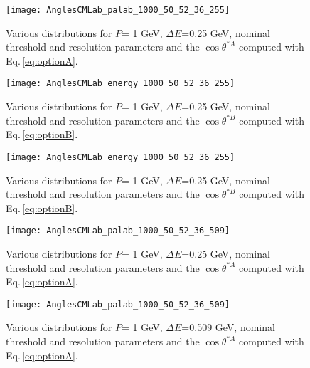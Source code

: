 \documentclass[12pt]{article}
\begin{document}
\begin{figure}[tbph]
\begin{center}
\texttt{[image: AnglesCMLab\_palab\_1000\_50\_52\_36\_255]}
\caption{Various distributions for $P$= 1 GeV, $\Delta E$=0.25 GeV, nominal threshold and resolution parameters and the $\cos{\theta^{*A}}$ computed with Eq.\,\ref{eq:optionA}.
\label{fig:AnglesCMLab_palab_1000_50_52_36_255_p3}}
\end{center}
\end{figure}

\begin{figure}[tbph]
\begin{center}
\texttt{[image: AnglesCMLab\_energy\_1000\_50\_52\_36\_255]}
\caption{Various distributions for $P$= 1 GeV, $\Delta E$=0.25 GeV, nominal threshold and resolution parameters and the $\cos{\theta^{*B}}$ computed with Eq.\,\ref{eq:optionB}.
\label{fig:AnglesCMLab_energy_1000_50_52_36_255_p2}}
\end{center}
\end{figure}

\begin{figure}[tbph]
\begin{center}
\texttt{[image: AnglesCMLab\_energy\_1000\_50\_52\_36\_255]}
\caption{Various distributions for $P$= 1 GeV, $\Delta E$=0.25 GeV, nominal threshold and resolution parameters and the $\cos{\theta^{*B}}$ computed with Eq.\,\ref{eq:optionB}.
\label{fig:AnglesCMLab_energy_1000_50_52_36_255_p3}}
\end{center}
\end{figure}

\begin{figure}[tbph]
\begin{center}
\texttt{[image: AnglesCMLab\_palab\_1000\_50\_52\_36\_509]}
\caption{Various distributions for $P$= 1 GeV, $\Delta E$=0.25 GeV, nominal threshold and resolution parameters and the $\cos{\theta^{*A}}$ computed with Eq.\,\ref{eq:optionA}.
\label{fig:AnglesCMLab_palab_1000_50_52_36_509_p2}}
\end{center}
\end{figure}

\begin{figure}[tbph]
\begin{center}
\texttt{[image: AnglesCMLab\_palab\_1000\_50\_52\_36\_509]}
\caption{Various distributions for $P$= 1 GeV, $\Delta E$=0.509 GeV, nominal threshold and resolution parameters and the $\cos{\theta^{*A}}$ computed with Eq.\,\ref{eq:optionA}.
\label{fig:AnglesCMLab_palab_1000_50_52_36_509_p3}}
\end{center}
\end{figure}
\end{document}
